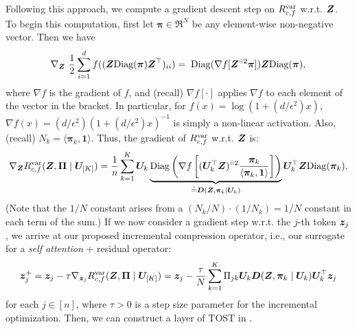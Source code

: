 \documentclass[../../book-main.tex]{subfiles}
\begin{document}
Following this approach, we compute a gradient descent step on $R_{c,f}^{\rm var}$ w.r.t. $\bm{Z}$.
To begin this computation, first let $\bm \pi \in \Re^N$ be any element-wise non-negative vector. Then we have
\begin{equation}\label{eq1:grad Rcf}
\nabla_{\Z} \ \frac{1}{2} \sum_{i = 1}^{d} f(  (\Z \mathrm{Diag}(\bm \pi) \Z^{\top} )_{ii}) %
= \; \mathrm{Diag}(\nabla f[ \Z^{\hada 2} \bm \pi] ) \Z \mathrm{Diag}(\bm \pi),
\end{equation}
%
where $\nabla f$ is the gradient of $f$, and (recall) $\nabla f[\cdot]$ applies $\nabla f$ to each element of the vector in the bracket. In particular, for $ f(x) = \log(1 + (d/\epsilon^{2}) x)$,  $\nabla f(x) = (d / \epsilon^{2}) (1+ (d / \epsilon^{2}) x)^{-1}$ is simply a non-linear activation. Also, (recall) $N_{k} = \langle \bm \pi_{k}, \bm 1\rangle$. Thus, the gradient of $R^{\rm var}_{c,f}$ w.r.t. $\bm{Z}$ is:
\begin{align}\label{eq2:grad Rcf}
    \nabla_{\Z} R^{\rm var}_{c,f}(\Z,\bm \Pi \mid \bm U_{[K]}) =  \frac{1}{n}
    \sum_{k=1}^K \bm U_{k} \underbrace{\mathrm{Diag} \left( \nabla f\left[ (\bm
    U_{k}^{\top} \Z)^{\hada 2}  \frac{\bm \pi_k}{\langle \bm \pi_{k}, \bm 1\rangle} \right] \right)}_{\doteq \bm D(\Z, \bm \pi_{k} \mid \bm U_{k})} \bm U_{k}^{\top} \Z \mathrm{Diag}(\bm \pi_k).
\end{align}
(Note that the $1/N$ constant arises from a $(N_{k}/N)\cdot (1/N_{k}) = 1/N$ constant in each term of the sum.) If we now consider a gradient step w.r.t. the $j$-th token $\bm{z}_j$
, we arrive at our proposed incremental compression operator, i.e., our surrogate for a \textit{self attention} + residual operator:
%
\vspace{-2mm}
\begin{equation}\label{eq:layer-operation-orig}
    \bm{z}_j^+ = \bm{z}_{j} - \tau \nabla_{\bm{z}_{j}}R_{c, f}^{\rm var}(\bm{Z}, \bm \Pi \mid \bm U_{[K]}) = \bm{z}_j - \frac{\tau}{N} \sum_{k=1}^K \Pi_{jk} \bm U_{k} \bm D(\bm{Z}, \bm \pi_{k} \mid \bm U_{k}) \bm U_{k}^{\top} \bm{z}_j
\end{equation}
for each \(j \in [n]\), where $\tau > 0$ is a step size parameter for the incremental optimization. Then, we can construct a layer of TOST in .  
\end{document}
